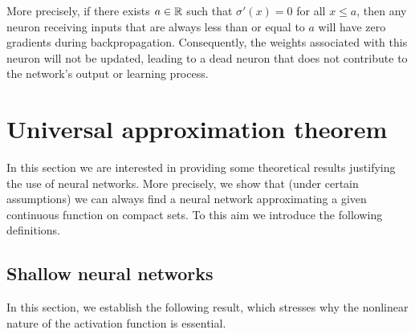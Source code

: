 More precisely, if there exists $a\in \mathbb{R}$ such that $\sigma'(x)=0$ for all $x\le a$, then any neuron receiving inputs that are always less than or equal to $a$ will have zero gradients during backpropagation.
Consequently, the weights associated with this neuron will not be updated, leading to a dead neuron that does not contribute to the network's output or learning process.

    
\section{Universal approximation theorem}

In this section we are interested in providing some theoretical results justifying the use of neural networks.
More precisely, we show that (under certain assumptions) we can always find a neural network approximating a given continuous function on compact sets.
To this aim we introduce the following definitions.




\subsection{Shallow neural networks}

In this section, we establish the following result, which stresses why the nonlinear nature of the activation function is essential.

